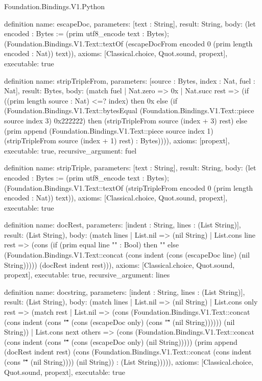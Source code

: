 \begin{lexlean}{Foundation.Bindings.V1.Python}
\begin{semanticmodule}
definition{
  name: escapeDoc,
  parameters: [text : String],
  result: String,
  body: (let encoded : Bytes := (prim utf8_encode text : Bytes); (Foundation.Bindings.V1.Text::textOf (escapeDocFrom encoded 0 (prim length encoded : Nat)) text)),
  axioms: [Classical.choice, Quot.sound, propext],
  executable: true
}

definition{
  name: stripTripleFrom,
  parameters: [source : Bytes, index : Nat, fuel : Nat],
  result: Bytes,
  body: (match fuel
    | Nat.zero => 0x
    | Nat.succ rest => (if ((prim length source : Nat) <=? index) then 0x else (if (Foundation.Bindings.V1.Text::bytesEqual (Foundation.Bindings.V1.Text::piece source index 3) 0x222222) then (stripTripleFrom source (index + 3) rest) else (prim append (Foundation.Bindings.V1.Text::piece source index 1) (stripTripleFrom source (index + 1) rest) : Bytes)))),
  axioms: [propext],
  executable: true,
  recursive_argument: fuel
}

definition{
  name: stripTriple,
  parameters: [text : String],
  result: String,
  body: (let encoded : Bytes := (prim utf8_encode text : Bytes); (Foundation.Bindings.V1.Text::textOf (stripTripleFrom encoded 0 (prim length encoded : Nat)) text)),
  axioms: [Classical.choice, Quot.sound, propext],
  executable: true
}

definition{
  name: docRest,
  parameters: [indent : String, lines : (List String)],
  result: (List String),
  body: (match lines
    | List.nil => (nil String)
    | List.cons line rest => (cons (if (prim equal line "" : Bool) then "" else (Foundation.Bindings.V1.Text::concat (cons indent (cons (escapeDoc line) (nil String))))) (docRest indent rest))),
  axioms: [Classical.choice, Quot.sound, propext],
  executable: true,
  recursive_argument: lines
}

definition{
  name: docstring,
  parameters: [indent : String, lines : (List String)],
  result: (List String),
  body: (match lines
    | List.nil => (nil String)
    | List.cons only rest => (match rest
      | List.nil => (cons (Foundation.Bindings.V1.Text::concat (cons indent (cons "\"\"\"" (cons (escapeDoc only) (cons "\"\"\"" (nil String)))))) (nil String))
      | List.cons next others => (cons (Foundation.Bindings.V1.Text::concat (cons indent (cons "\"\"\"" (cons (escapeDoc only) (nil String))))) (prim append (docRest indent rest) (cons (Foundation.Bindings.V1.Text::concat (cons indent (cons "\"\"\"" (nil String)))) (nil String)) : (List String))))),
  axioms: [Classical.choice, Quot.sound, propext],
  executable: true
}


\end{semanticmodule}
\end{lexlean}
